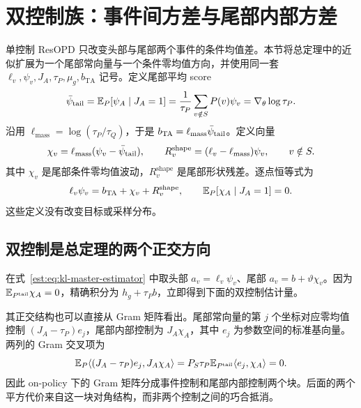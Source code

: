 \section{双控制族：事件间方差与尾部内部方差}
\label{est:sec:kl-two-controls}

单控制 ResOPD 只改变头部与尾部两个事件的条件均值差。本节将总定理中的近似扩展为一个尾部常向量与一个条件零均值方向，并使用同一套 $\ell_v,\psi_v,J_A,\tau_P,\mu_g,b_{\mathrm{TA}}$ 记号。定义尾部平均 score
\begin{equation*}
 \bar\psi_{\mathrm{tail}}=\mathbb E_P[\psi_A\mid J_A=1]
 =\frac{1}{\tau_P}\sum_{v\notin S}P(v)\psi_v
 =\nabla_\theta\log\tau_P.
\end{equation*}
沿用 $\ell_{\mathrm{mass}}=\log(\tau_P/\tau_Q)$，于是 $b_{\mathrm{TA}}=\ell_{\mathrm{mass}}\bar\psi_{\mathrm{tail}}$。定义向量
\begin{equation*}
 \chi_v=\ell_{\mathrm{mass}}(\psi_v-\bar\psi_{\mathrm{tail}}),\qquad
 R_v^{\mathrm{shape}}=(\ell_v-\ell_{\mathrm{mass}})\psi_v,\qquad v\notin S.
\end{equation*}
其中 $\chi_v$ 是尾部条件零均值波动，$R_v^{\mathrm{shape}}$ 是尾部形状残差。逐点恒等式为
\begin{equation}
 \ell_v\psi_v=b_{\mathrm{TA}}+\chi_v+R_v^{\mathrm{shape}},\qquad
 \mathbb E_P[\chi_A\mid J_A=1]=0.
 \label{est:eq:kl-tail-fine-decomposition}
\end{equation}
这些定义没有改变目标或采样分布。

\subsection{双控制是总定理的两个正交方向}

在式~\eqref{est:eq:kl-master-estimator} 中取头部 $a_v=\ell_v\psi_v$、尾部 $a_v=b+\vartheta\chi_v$。因为 $\mathbb E_{P^{\mathrm{tail}}}\chi_A=0$，精确积分为 $h_g+\tau_Pb$，立即得到下面的双控制估计量。

其正交结构也可以直接从 Gram 矩阵看出。尾部常向量的第 $j$ 个坐标对应零均值控制 $(J_A-\tau_P)e_j$，尾部内部控制为 $J_A\chi_A$，其中 $e_j$ 为参数空间的标准基向量。两列的 Gram 交叉项为
\begin{equation*}
 \mathbb E_P\langle(J_A-\tau_P)e_j,J_A\chi_A\rangle
 =P_S\tau_P\mathbb E_{P^{\mathrm{tail}}}\langle e_j,\chi_A\rangle=0.
\end{equation*}
因此 on-policy 下的 Gram 矩阵分成事件控制和尾部内部控制两个块。后面的两个平方代价来自这一块对角结构，而非两个控制之间的巧合抵消。

